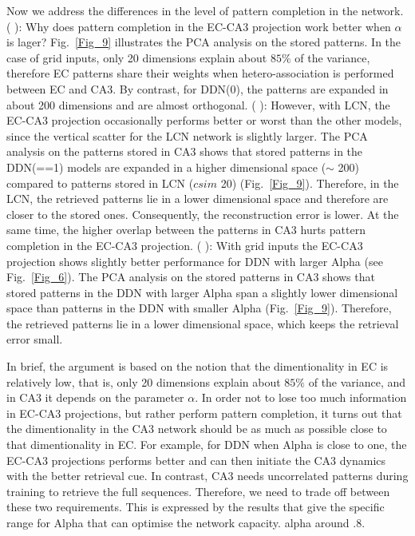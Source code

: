 \documentclass[utf8]{frontiersSCNS} %
\newcommand{\RN}[1]{%
  \textup{\uppercase\expandafter{\romannumeral#1}}%
}
\begin{document}
Now we address the differences in the level of pattern completion in the network. (\RN{1}): Why does pattern completion in the EC-CA3 projection work better when $\alpha$ is lager? Fig.~\ref{Fig_9} illustrates the PCA analysis on the stored patterns. In the case of grid inputs, only 20 dimensions explain about $85 \%$ of the variance, therefore EC patterns share their weights when hetero-association is performed between EC and CA3. By contrast, for DDN(0), the patterns are expanded in about 200 dimensions and are almost orthogonal. (\RN{2}): 
However, with LCN, the EC-CA3 projection occasionally performs better or worst than the other models, since the vertical scatter for the LCN network is slightly larger. The PCA analysis on the patterns stored in CA3 shows that stored patterns in the DDN(==1) models are expanded in a higher dimensional space ($\sim$ 200) compared to patterns stored in LCN ($csim$ 20) (Fig.~\ref{Fig_9}). Therefore, in the LCN, the retrieved patterns lie in a lower dimensional space and therefore are closer to the stored ones. Consequently, the reconstruction error is lower. At the same time, the higher overlap between the patterns in CA3 hurts pattern completion in the EC-CA3 projection. (\RN{3}): With grid inputs the EC-CA3 projection shows slightly better performance for DDN with larger Alpha (see Fig.~\ref{Fig_6}). The PCA analysis on the stored patterns in CA3 shows that stored patterns in the DDN with larger Alpha span a slightly lower dimensional space than patterns in the DDN with smaller Alpha (Fig.~\ref{Fig_9}). Therefore, the retrieved patterns lie in a lower dimensional space, which keeps the retrieval error small.

In brief, the argument is based on the notion that the dimentionality in EC is relatively low, that is, only 20 dimensions explain about $85 \%$ of the variance, and in CA3 it depends on the parameter $\alpha$. In order not to lose too much information in EC-CA3 projections, but rather perform pattern completion, it turns out that the dimentionality in the CA3 network should be as much as possible close to that dimentionality in EC. For example, for DDN when Alpha is close to one, the EC-CA3 projections performs better and can then initiate the CA3 dynamics with the better retrieval cue. In contrast, CA3 needs uncorrelated patterns during training to retrieve the full sequences.  Therefore, we need to trade off between these two requirements. This is expressed by the results that give the specific range for Alpha that can optimise the network capacity. alpha around .8. 
%
\end{document}
